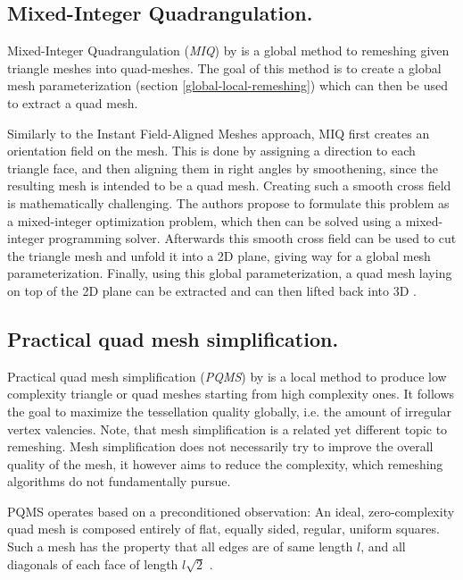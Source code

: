\documentclass{ACGSeminar}
\begin{document}
\subsection*{Mixed-Integer Quadrangulation.}\label{MIQ}
Mixed-Integer Quadrangulation (\textit{MIQ}) by \cite{bommes2009mixed} is a global method to remeshing given triangle meshes into quad-meshes. The goal of this method is to create a global mesh parameterization (section \ref{global-local-remeshing}) which can then be used to extract a quad mesh.\bigskip

Similarly to the Instant Field-Aligned Meshes approach, MIQ first creates an orientation field on the mesh. This is done by assigning a direction to each triangle face, and then aligning them in right angles by smoothening, since the resulting mesh is intended to be a quad mesh. Creating such a smooth cross field is mathematically challenging. The authors propose to formulate this problem as a mixed-integer optimization problem, which then can be solved using a mixed-integer programming solver. Afterwards this smooth cross field can be used to cut the triangle mesh and unfold it into a 2D plane, giving way for a global mesh parameterization. Finally, using this global parameterization, a quad mesh laying on top of the 2D plane can be extracted and can then lifted back into 3D \cite{bommes2009mixed,schmidt2014towards}.

\subsection*{Practical quad mesh simplification.}\label{PQMS}
Practical quad mesh simplification (\textit{PQMS}) by \cite{tarini2010practical} is a local method to produce low complexity triangle or quad meshes starting from high complexity ones. It follows the goal to maximize the tessellation quality globally, i.e. the amount of irregular vertex valencies. Note, that mesh simplification is a related yet different topic to remeshing. Mesh simplification does not necessarily try to improve the overall quality of the mesh, it however aims to reduce the complexity, which remeshing algorithms do not fundamentally pursue.\bigskip

PQMS operates based on a preconditioned observation: An ideal, zero-complexity quad mesh is composed entirely of flat, equally sided, regular, uniform squares. Such a mesh has the property that all edges are of same length $l$, and all diagonals of each face of length $l \sqrt{2}$ \cite{tarini2010practical}.
\end{document}

